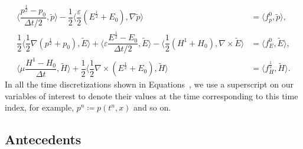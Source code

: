 \documentclass{amsart}
\theoremstyle{thmstyleone}%
\theoremstyle{thmstyletwo}%
\theoremstyle{thmstylethree}%
\newcommand{\aInnerproduct}[2]{\bigl\langle #1, #2 \bigr\rangle}
\begin{document}
\begin{subequations}
  \begin{align}
    \aInnerproduct{\dfrac{p^{\frac{1}{2}} - p_0}{\Delta t/2}}{\widetilde{p}} - \dfrac{1}{2} \aInnerproduct{\dfrac{\varepsilon}{2} \left( E^{\frac{1}{2}} + E_0 \right)}{\nabla \widetilde{p}} &= \aInnerproduct{ f_p^0}{\widetilde{p}}, \label{eqn:maxwell_p0_lf} \\
  \dfrac{1}{2}  \aInnerproduct{\dfrac{1}{2} \nabla \left(  p^{\frac{1}{2}} +  p_0 \right)}{\widetilde{E}} + \aInnerproduct{\varepsilon \dfrac{E^{\frac{1}{2}} - E_0}{\Delta t/2}}{\widetilde{E}} - \aInnerproduct{\dfrac{1}{2} \left( H^1 + H_0 \right)}{\nabla \times \widetilde{E}} &= \aInnerproduct{f_E^0}{\widetilde{E}}, \label{eqn:maxwell_E0_lf} \\
    \aInnerproduct{\mu \dfrac{H^1 - H_0}{\Delta t}}{\widetilde{H}} + \dfrac{1}{2} \aInnerproduct{\dfrac{1}{2} \nabla \times \left(E^{\frac{1}{2}} + E_0 \right)}{\widetilde{H}} &= \aInnerproduct{f_H^{\frac{1}{2}}}{\widetilde{H}}. \label{eqn:maxwell_H0_lf}
  \end{align}
\end{subequations}
In all the time discretizations shown in Equations~, we use a superscript on our variables of interest to denote their values at the time corresponding to this time index, for example, $p^n \coloneq p(t^n, x)$ and so on.


\subsection{Antecedents} \label{sec:antecedents}
\end{document}
